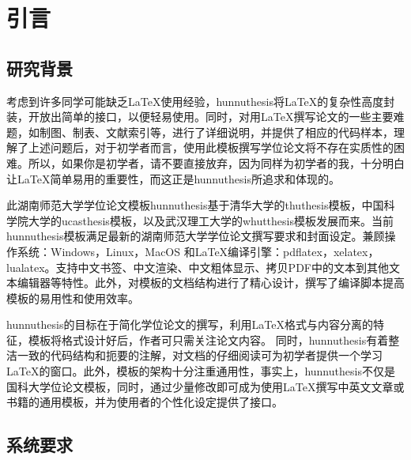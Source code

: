 \chapter{引言}\label{chap:introduction}

\section{研究背景}

考虑到许多同学可能缺乏\LaTeX{}使用经验，hunnuthesis将\LaTeX{}的复杂性高度封装，开放出简单的接口，以便轻易使用。同时，对用\LaTeX{}撰写论文的一些主要难题，如制图、制表、文献索引等，进行了详细说明，并提供了相应的代码样本，理解了上述问题后，对于初学者而言，使用此模板撰写学位论文将不存在实质性的困难。所以，如果你是初学者，请不要直接放弃，因为同样为初学者的我，十分明白让\LaTeX{}简单易用的重要性，而这正是hunnuthesis所追求和体现的。

此湖南师范大学学位论文模板hunnuthesis基于清华大学的thuthesis模板，中国科学院大学的ucasthesis模板，以及武汉理工大学的whutthesis模板发展而来。当前hunnuthesis模板满足最新的湖南师范大学学位论文撰写要求和封面设定。兼顾操作系统：Windows，Linux，MacOS 和\LaTeX{}编译引擎：pdflatex，xelatex，lualatex。支持中文书签、中文渲染、中文粗体显示、拷贝PDF中的文本到其他文本编辑器等特性。此外，对模板的文档结构进行了精心设计，撰写了编译脚本提高模板的易用性和使用效率。

hunnuthesis的目标在于简化学位论文的撰写，利用\LaTeX{}格式与内容分离的特征，模板将格式设计好后，作者可只需关注论文内容。 同时，hunnuthesis有着整洁一致的代码结构和扼要的注解，对文档的仔细阅读可为初学者提供一个学习\LaTeX{}的窗口。此外，模板的架构十分注重通用性，事实上，hunnuthesis不仅是国科大学位论文模板，同时，通过少量修改即可成为使用\LaTeX{}撰写中英文文章或书籍的通用模板，并为使用者的个性化设定提供了接口。

\section{系统要求}\label{sec:system}

